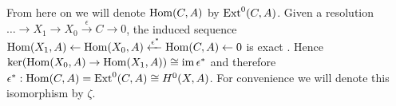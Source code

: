 From here on we will denote $\operatorname{Hom}(C,A)$ by $\operatorname{Ext}^{0}(C,A)$.
Given a resolution $\dots \to X_1 \to X_0 \xrightarrow{\epsilon} C \to 0$, the induced sequence
$\operatorname{Hom}(X_1,A) \leftarrow \operatorname{Hom}(X_0,A) \xleftarrow{\epsilon^*} \operatorname{Hom}(C,A) \leftarrow 0$
is exact \cite[Theorem II.6.1.]{maclane}.
Hence $\ker (\operatorname{Hom}(X_0,A)\to \operatorname{Hom}(X_1,A)) \cong \operatorname{im} \epsilon^*$ and therefore $\epsilon^*: \operatorname{Hom}(C,A) = \operatorname{Ext}^{0}(C,A) \cong H^0(X,A)$.
For convenience we will denote this isomorphism by $\zeta$.